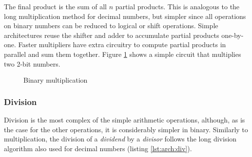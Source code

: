 The final product is the sum of all $n$ partial products.  This is analogous to
the long multiplication method for decimal numbers, but simpler since all
operations on binary numbers can be reduced to logical or shift operations.
Simple architectures reuse the shifter and adder to accumulate partial products
one-by-one.  Faster multipliers have extra circuitry to compute partial products
in parallel and sum them together.  Figure \ref{fig:arch:mul} shows a simple
circuit that multiplies two 2-bit numbers.

\begin{figure}[ht]
    \centering
    \hspace{2em}
    \begin{subfigure}[h]{0.65\textwidth}
        
    \end{subfigure}
    \caption{Binary multiplication}
    \label{fig:arch:mul}
\end{figure}

\subsubsection{Division}

Division is the most complex of the simple arithmetic operations, although, as
is the case for the other operations, it is considerably simpler in binary.
Similarly to multiplication, the division of a \textit{dividend} by a
\textit{divisor} follows the long division algorithm also used for decimal
numbers (listing \ref{lst:arch:div}).


